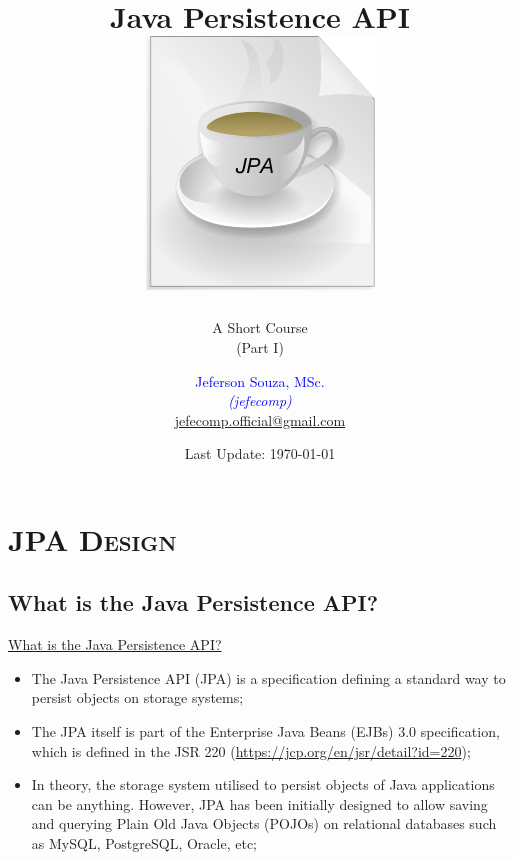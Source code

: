 \documentclass[xcolor=x11names,compress]{beamer}
\renewcommand{\(}{\begin{columns}}
\renewcommand{\)}{\end{columns}}
\newcommand{\<}[1]{\begin{column}{#1}}
\renewcommand{\>}{\end{column}}
\begin{document}
\title{Java Persistence API \\[4mm]
\includegraphics[keepaspectratio,width=.3\textwidth]{JPA}}
\subtitle{A Short Course \\ (Part I) \vspace*{-4mm}}
\author[Jeferson Souza, MSc (jefecomp) - All rights reserved.]{
	\textcolor{blue}{Jeferson Souza, MSc.} \\[1mm] 
	\textcolor{blue}{\textit{{\footnotesize (jefecomp) }}}\\[1.5mm]
	 \underline{{\footnotesize jefecomp.official@gmail.com}}
	 \vspace*{-6mm}
}
\date{{\footnotesize Last Update: \today}}


\begin{frame}
\titlepage
\end{frame}

\section{\scshape JPA Design}
\subsection{What is the Java Persistence API?}
\begin{frame}{\underline{What is the Java Persistence API?}}
\begin{itemize}
\itemsep 12pt
\justifying
\item The Java Persistence API (JPA) is a specification defining a standard way to persist objects on storage systems;

\item The JPA itself is part of the Enterprise Java Beans (EJBs) 3.0 specification, which is defined in the JSR 220 (\url{https://jcp.org/en/jsr/detail?id=220});

\item In theory, the storage system utilised to persist objects of Java applications can be anything. However, JPA has been initially designed to allow saving and querying Plain Old Java Objects (POJOs) on relational databases such as MySQL, PostgreSQL, Oracle, etc;

\end{itemize}
\end{frame}
\end{document}

